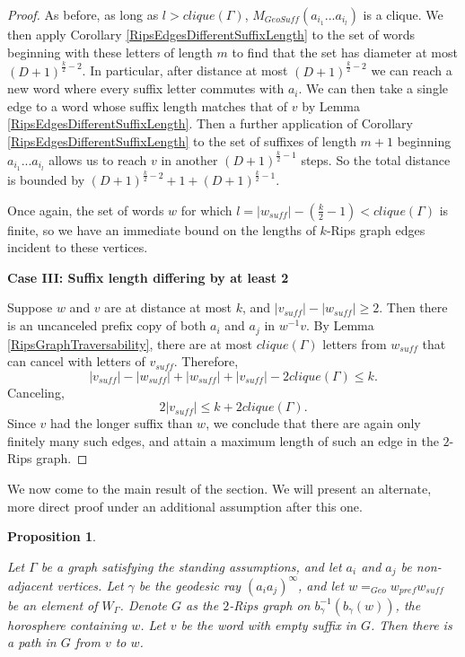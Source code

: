 \documentclass[10pt,a4paper]{amsart}
\newtheorem{proposition}[theorem]{Proposition}
\theoremstyle{definition}
\theoremstyle{remark}
\begin{document}
\begin{proof}
		As before, as long as $l>clique(\Gamma)$, $M_{GeoSuff}(a_{i_1}...a_{i_l})$ is a clique. We then apply Corollary \ref{RipsEdgesDifferentSuffixLength}  to the set of words beginning with these letters of length $m$ to find that the set has diameter at most $(D+1)^{\frac{k}{2}-2}$. In particular, after distance at most $(D+1)^{\frac{k}{2}-2}$ we can reach a new word where every suffix letter commutes with $a_i$. We can then take a single edge to a word whose suffix length matches that of $v$ by Lemma \ref{RipsEdgesDifferentSuffixLength}. Then a further application of Corollary \ref{RipsEdgesDifferentSuffixLength} to the set of suffixes of length $m+1$ beginning $a_{i_1}...a_{i_l}$ allows us to reach $v$ in another $(D+1)^{\frac{k}{2}-1}$ steps. So the total distance is bounded by $(D+1)^{\frac{k}{2}-2}+1+(D+1)^{\frac{k}{2}-1}$.
		
		Once again, the set of words $w$ for which $l=|w_{suff}|-(\frac{k}{2}-1)<clique(\Gamma)$ is finite, so we have an immediate bound on the lengths of $k$-Rips graph edges incident to these vertices.
		
		\textbf{Case III: Suffix length differing by at least 2}
		
		Suppose $w$ and $v$ are at distance at most $k$, and $|v_{suff}|-|w_{suff}| \ge 2$. Then there is an uncanceled prefix copy of both $a_i$ and $a_j$ in $w^{-1}v$. By Lemma \ref{RipsGraphTraversability}, there are at most $clique(\Gamma)$ letters from $w_{suff}$ that can cancel with letters of $v_{suff}$. Therefore, $$|v_{suff}|-|w_{suff}|+|w_{suff}|+|v_{suff}|-2clique(\Gamma)\le k.$$ Canceling, $$2|v_{suff}|\le k+2clique(\Gamma).$$ Since $v$ had the longer suffix than $w$, we conclude that there are again only finitely many such edges, and attain a maximum length of such an edge in the $2$-Rips graph. \end{proof}
	
	
	We now come to the main result of the section. We will present an alternate, more direct proof under an additional assumption after this one.
	
	\begin{proposition} \label{RipsGraphOriginConnectivity}
		
		Let $\Gamma$ be a graph satisfying the standing assumptions, and let $a_i$ and $a_j$ be non-adjacent vertices. Let $\gamma$ be the geodesic ray $(a_ia_j)^\infty$, and let  $w=_{Geo}w_{pref}w_{suff}$ be an element of $W_\Gamma$. Denote $G$ as the $2$-Rips graph on $b_{\gamma}^{-1}(b_{\gamma}(w))$, the horosphere containing $w$. Let $v$ be the word with empty suffix in $G$. Then there is a path in $G$ from $v$ to $w$.
		
	\end{proposition}
	
\end{document}
